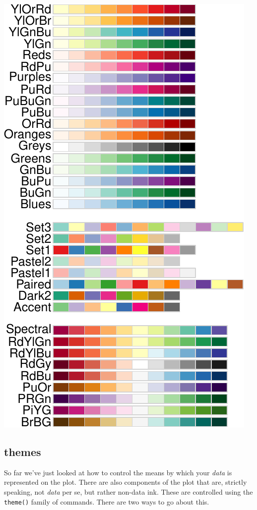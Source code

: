 \documentclass[
]{krantz}
\begin{document}
\begin{center}\includegraphics{index_files/figure-latex/unnamed-chunk-61-1} \end{center}

\hypertarget{themes}{%
\subsection{themes}\label{themes}}

So far we've just looked at how to control the means by which your \emph{data} is represented on the plot. There are also components of the plot that are, strictly speaking, not \emph{data} per se, but rather non-data ink. These are controlled using the \texttt{theme()} family of commands. There are two ways to go about this.
\end{document}
